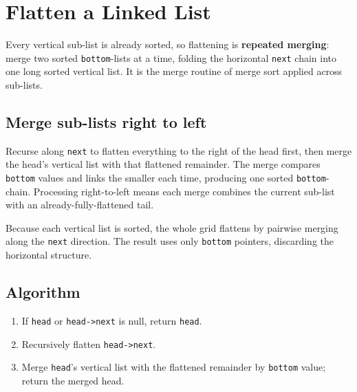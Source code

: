 \section{Flatten a Linked List}
\label{sec:ll-flatten}


\begin{patternbox}
Every vertical sub-list is already sorted, so flattening is \textbf{repeated
merging}: merge two sorted \texttt{bottom}-lists at a time, folding the
horizontal \texttt{next} chain into one long sorted vertical list. It is the
merge routine of merge sort applied across sub-lists.
\end{patternbox}

\subsection*{Merge sub-lists right to left}

Recurse along \texttt{next} to flatten everything to the right of the head
first, then merge the head's vertical list with that flattened remainder.
The merge compares \texttt{bottom} values and links the smaller each time,
producing one sorted \texttt{bottom}-chain. Processing right-to-left means
each merge combines the current sub-list with an already-fully-flattened
tail.

\begin{ideabox}
Because each vertical list is sorted, the whole grid flattens by pairwise
merging along the \texttt{next} direction. The result uses only
\texttt{bottom} pointers, discarding the horizontal structure.
\end{ideabox}

\subsection*{Algorithm}

\begin{enumerate}
  \item If \texttt{head} or \texttt{head->next} is null, return
        \texttt{head}.
  \item Recursively flatten \texttt{head->next}.
  \item Merge \texttt{head}'s vertical list with the flattened remainder by
        \texttt{bottom} value; return the merged head.
\end{enumerate}

